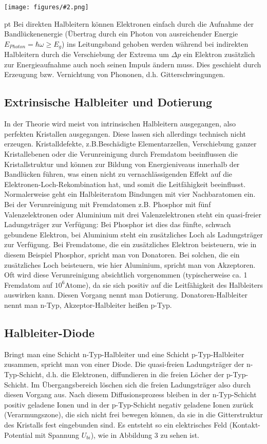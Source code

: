 \documentclass[12pt]{article}
\newcommand{\gra}[3][0.7]{
	\begin{minipage}[h!]{\textwidth}
		\centering
		\texttt{[image: figures/\#2.png]}
		\captionof{figure}{#3}
	\end{minipage}
	\vskip 30 pt
	}
\begin{document}
\gra{(in)direkte_Halbleiter}{Direkte und indirekte Halbleiter}\cite{staat}
Bei direkten Halbleitern können Elektronen einfach durch die Aufnahme der Bandlückenenergie (Übertrag durch ein Photon von ausreichender Energie $E_{Photon}=\hbar\omega\geq E_g$) ins Leitungsband gehoben werden während bei indirekten Halbleitern durch die Verschiebung der Extrema um $\Delta p$ ein Elektron zusätzlich zur Energieaufnahme auch noch seinen Impuls ändern muss. Dies geschieht durch Erzeugung bzw. Vernichtung von Phononen, d.h. Gitterschwingungen.

\subsection{Extrinsische Halbleiter und Dotierung}

In der Theorie wird meist von intrinsischen Halbleitern ausgegangen, also perfekten Kristallen ausgegangen.  Diese lassen sich allerdings technisch nicht erzeugen. Kristalldefekte, z.B.Beschädigte Elementarzellen, Verschiebung ganzer Kristallebenen oder die Verunreinigung durch Fremdatom beeinflussen die Kristallstruktur und können zur Bildung von Energieniveaus innerhalb der Bandlücken führen, was einen nicht zu vernachlässigenden Effekt auf die Elektronen-Loch-Rekombination hat, und somit die Leitfähigkeit beeinflusst.\\
Normalerweise geht ein Halbleiteratom Bindungen mit vier Nachbaratomen ein. Bei der Verunreinigung mit Fremdatomen z.B. Phosphor mit fünf Valenzelektronen oder Aluminium mit drei Valenzelektronen steht ein quasi-freier Ladungsträger zur Verfügung: Bei Phosphor ist dies das fünfte, schwach gebundene Elektron, bei Aluminium steht ein zusätzliches Loch als Ladungsträger zur Verfügung. Bei Fremdatome, die ein zusätzliches Elektron beisteuern, wie in diesem Beispiel Phosphor, spricht man von Donatoren. Bei solchen, die ein zusätzliches Loch beisteuern, wie hier Aluminium, spricht man von Akzeptoren.
Oft wird diese Verunreinigung absichtlich vorgenommen (typischerweise ca. 1 Fremdatom auf $10^6$Atome), da sie sich positiv auf die Leitfähigkeit des Halbleiters auswirken kann. Diesen Vorgang nennt man Dotierung. Donatoren-Halbleiter nennt man n-Typ, Akzeptor-Halbleiter heißen p-Typ.
\subsection{Halbleiter-Diode}

Bringt man eine Schicht n-Typ-Halbleiter und eine Schicht p-Typ-Halbleiter zusammen, spricht man von einer Diode. Die quasi-freien Ladungsträger der n-Typ-Schicht, d.h. die Elektronen, diffundieren in die freien Löcher der p-Typ-Schicht. Im Übergangsbereich löschen sich die freien Ladungsträger also durch diesen Vorgang aus. 
Nach diesem Diffusionsprozess bleiben in der n-Typ-Schicht positiv geladene Ionen und in der p-Typ-Schicht negativ geladene Ionen zurück (Verarmungszone), die sich nicht frei bewegen können, da sie in die Gitterstruktur des Kristalls fest eingebunden sind. Es entsteht so ein elektrisches Feld (Kontakt-Potential mit Spannung $U_{bi}$), wie in Abbildung 3 zu sehen ist. 
\end{document}
